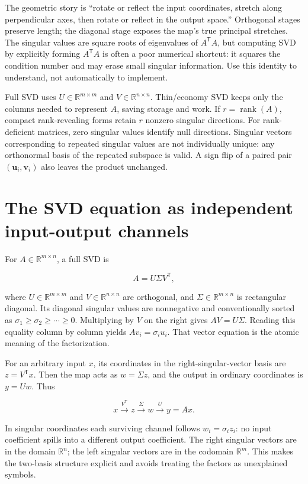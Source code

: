 The geometric story is ``rotate or reflect the input coordinates, stretch along perpendicular axes, then rotate or reflect in the output space.'' Orthogonal stages preserve length; the diagonal stage exposes the map's true principal stretches. The singular values are square roots of eigenvalues of \(A^\mathsf T A\), but computing SVD by explicitly forming \(A^\mathsf T A\) is often a poor numerical shortcut: it squares the condition number and may erase small singular information. Use this identity to understand, not automatically to implement.

Full SVD uses \(U\in\mathbb R^{m\times m}\) and \(V\in\mathbb R^{n\times n}\). Thin/economy SVD keeps only the columns needed to represent \(A\), saving storage and work. If \(r=\operatorname{rank}(A)\), compact rank-revealing forms retain \(r\) nonzero singular directions. For rank-deficient matrices, zero singular values identify null directions. Singular vectors corresponding to repeated singular values are not individually unique: any orthonormal basis of the repeated subspace is valid. A sign flip of a paired pair \((\mathbf u_i,\mathbf v_i)\) also leaves the product unchanged.

\section{The SVD equation as independent input-output channels}\label{02-foundations-ii-ch024-the-svd-equation-as-independent-input-output-channels}

For \(A\in\mathbb R^{m\times n}\), a full SVD is

\[
A=U\Sigma V^\mathsf T,
\]

where \(U\in\mathbb R^{m\times m}\) and \(V\in\mathbb R^{n\times n}\) are orthogonal, and \(\Sigma\in\mathbb R^{m\times n}\) is rectangular diagonal. Its diagonal singular values are nonnegative and conventionally sorted as \(\sigma_1\ge\sigma_2\ge\cdots\ge0\). Multiplying by \(V\) on the right gives \(AV=U\Sigma\). Reading this equality column by column yields \(Av_i=\sigma_i u_i\). That vector equation is the atomic meaning of the factorization.

For an arbitrary input \(x\), its coordinates in the right-singular-vector basis are \(z=V^\mathsf T x\). Then the map acts as \(w=\Sigma z\), and the output in ordinary coordinates is \(y=Uw\). Thus

\[
x\xrightarrow{V^\mathsf T}z\xrightarrow{\Sigma}w\xrightarrow{U}y=Ax.
\]

In singular coordinates each surviving channel follows \(w_i=\sigma_i z_i\): no input coefficient spills into a different output coefficient. The right singular vectors are in the domain \(\mathbb R^n\); the left singular vectors are in the codomain \(\mathbb R^m\). This makes the two-basis structure explicit and avoids treating the factors as unexplained symbols.

